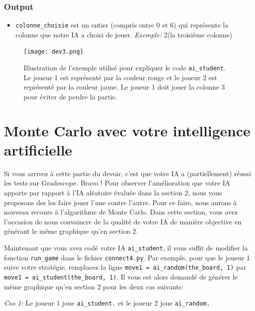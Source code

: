 \documentclass[11pt,answers]{exam}
\begin{document}
\subsubsection*{Output}

\begin{itemize}
	\item \texttt{colonne\_choisie} est un entier (compris entre 0 et 6) qui représente la colonne que notre IA a choisi de jouer. \emph{Exemple:} 2(la troisième colonne)
\end{itemize}

\bigskip

\begin{figure}[!ht]
	\centering
	\texttt{[image: dev3.png]}
 	\caption{Illustration de l'exemple utilisé pour expliquer le code \texttt{ai\_student}. Le joueur 1 est représenté par la couleur rouge et le joueur 2 est représenté par la couleur jaune. Le joueur 1 doit jouer la colonne 3 pour éviter de perdre la partie.}
	\label{fig:ex_sec3}
\end{figure}

\newpage

\section{Monte Carlo avec votre intelligence artificielle}

Si vous arrivez à cette partie du devoir, c'est que votre IA a (partiellement) réussi les tests sur Gradescope. Bravo ! Pour observer l'amélioration que votre IA apporte par rapport à l'IA aléatoire évaluée dans la section 2, nous vous proposons des les faire jouer l'une contre l'autre. Pour ce faire, nous aurons à nouveau recours à l'algorithme de Monte Carlo. Dans cette section, vous avez l'occasion de nous convaincre de la qualité de votre IA de manière objective en générant le même graphique qu'en section 2.

\bigskip

Maintenant que vous avez codé votre IA \texttt{ai\_student}, il vous suffit de modifier la fonction \texttt{run\_game} dans le fichier \texttt{connect4.py}. Par exemple, pour que le joueur 1 suive votre stratégie, remplacez la ligne \texttt{move1 = ai\_random(the\_board, 1)} par \texttt{move1 = ai\_student(the\_board, 1)}. Il vous est alors demandé de générer le même graphique qu'en section 2 pour les deux cas suivants:

\newpage

\emph{Cas 1:} Le joueur 1 joue \texttt{ai\_student.} et le joueur 2 joue \texttt{ai\_random.}
\end{document}
